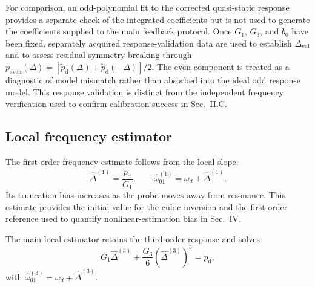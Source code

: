 For comparison, an odd-polynomial fit to the corrected quasi-static response
provides a separate check of the integrated coefficients but is not used to
generate the coefficients supplied to the main feedback protocol. Once
$G_1$, $G_3$, and $b_0$ have been fixed, separately acquired
response-validation data are used to establish
$\Delta_{\mathrm{val}}$ and to assess residual symmetry breaking through
$p_{\mathrm{even}}(\Delta)
=[\widetilde p_{\mathrm d}(\Delta)
+\widetilde p_{\mathrm d}(-\Delta)]/2$.
The even component is treated as a diagnostic of model mismatch rather than
absorbed into the ideal odd response model. This response validation is
distinct from the independent frequency verification used to confirm
calibration success in Sec.~II.C.



\subsection{Local frequency estimator}
\label{sec:local-estimator}

The first-order frequency estimate follows from the local slope:
%
\begin{equation}
\widehat\Delta^{(1)}
=
\frac{\widetilde p_{\mathrm d}}{G_1},
\qquad
\widehat\omega_{01}^{(1)}
=
\omega_d+\widehat\Delta^{(1)}.
\label{eq:linear-frequency-estimator}
\end{equation}
%
Its truncation bias increases as the probe moves away from resonance. This
estimate provides the initial value for the cubic inversion and the
first-order reference used to quantify nonlinear-estimation bias in
Sec.~IV.

The main local estimator retains the third-order response and solves
%
\begin{equation}
G_1\widehat\Delta^{(3)}
+
\frac{G_3}{6}
\left(\widehat\Delta^{(3)}\right)^3
=
\widetilde p_{\mathrm d},
\label{eq:cubic-frequency-estimator}
\end{equation}
%
with
$\widehat\omega_{01}^{(3)}
=\omega_d+\widehat\Delta^{(3)}$.

